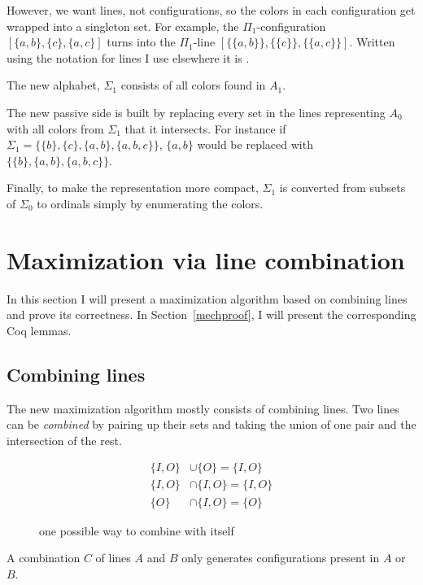 \documentclass[english, 12pt, a4paper, sci, a-1b, online]{aaltothesis}
\begin{document}
However, we want lines, not configurations, so the colors in each configuration get wrapped into a singleton set. For example, the $\Pi_1$-configuration $[\{a, b\}, \{c\}, \{a, c\}]$ turns into the $\Pi_1$-line $[\{\{a, b\}\}, \{\{c\}\}, \{\{a, c\}\}]$. Written using the notation for lines I use elsewhere it is .

The new alphabet, $\Sigma_1$ consists of all colors found in $A_1$.

The new passive side is built by replacing every set in the lines representing $A_0$ with all colors from $\Sigma_1$ that it intersects. For instance if $\Sigma_1 = \{\{b\}, \{c\}, \{a, b\}, \{a, b, c\}\}$, $\{a, b\}$ would be replaced with $\{\{b\}, \{a, b\}, \{a, b, c\}\}$.

Finally, to make the representation more compact, $\Sigma_1$ is converted from subsets of $\Sigma_0$ to ordinals simply by enumerating the colors.


\section{Maximization via line combination}\label{nlproof}

In this section I will present a maximization algorithm based on combining lines and prove its correctness. In Section~\ref{mechproof}, I will present the corresponding Coq lemmas.

\subsection{Combining lines}

The new maximization algorithm mostly consists of combining lines. Two lines can be \emph{combined} by pairing up their sets and taking the union of one pair and the intersection of the rest.

\begin{figure}[h]
\begin{align*}
  \{I,O\} &\cup \{O\} = \{I, O\} \\
  \{I,O\} &\cap \{I,O\} = \{I, O\} \\
  \{O\} &\cap \{I, O\} = \{O\}
\end{align*}
\caption{one possible way to combine  with itself}
\end{figure}

\begin{theorem}
\label{sound}
A combination $C$ of lines $A$ and $B$ only generates configurations present in $A$ or $B$.
\end{theorem}
\end{document}
